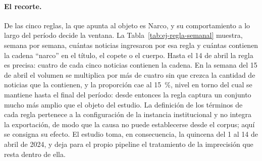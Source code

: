 \documentclass[12pt]{report}
\begin{document}
\paragraph{El recorte.} De las cinco reglas, la que apunta al objeto es Narco, y su comportamiento a lo largo del período decide la ventana. La Tabla~\ref{tab:ej-regla-semanal} muestra, semana por semana, cuántas noticias ingresaron por esa regla y cuántas contienen la cadena ``narco'' en el título, el copete o el cuerpo. Hasta el 14 de abril la regla es precisa: cuatro de cada cinco noticias contienen la cadena. En la semana del 15 de abril el volumen se multiplica por más de cuatro sin que crezca la cantidad de noticias que la contienen, y la proporción cae al 15~\%, nivel en torno del cual se mantiene hasta el final del período: desde entonces la regla captura un conjunto mucho más amplio que el objeto del estudio. La definición de los términos de cada regla pertenece a la configuración de la instancia institucional y no integra la exportación, de modo que la causa no puede establecerse desde el corpus; aquí se consigna su efecto. El estudio toma, en consecuencia, la quincena del 1 al 14 de abril de 2024, y deja para el propio pipeline el tratamiento de la imprecisión que resta dentro de ella.
\end{document}

